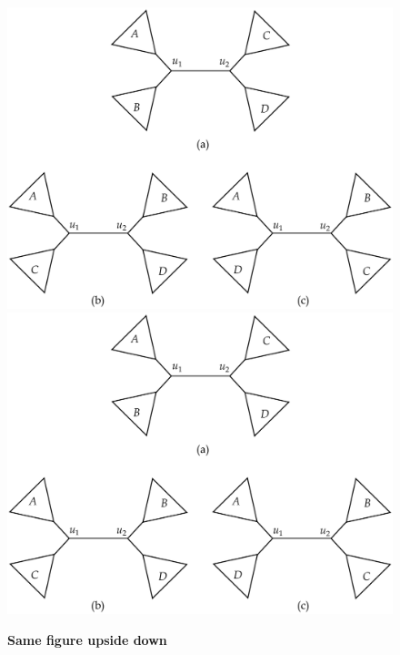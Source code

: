 \documentclass[12pt, a4paper]{article}
\begin{document}
	\begin{figure}[t]
		\centering
		\includegraphics[scale=0.33, angle =180 ]{Figure3.pdf}
		\includegraphics[scale=0.33]{Figure3.pdf}
		\caption{\textbf{Same figure upside down}}
		\label{fg:fg1}
	\end{figure}
\end{document}
